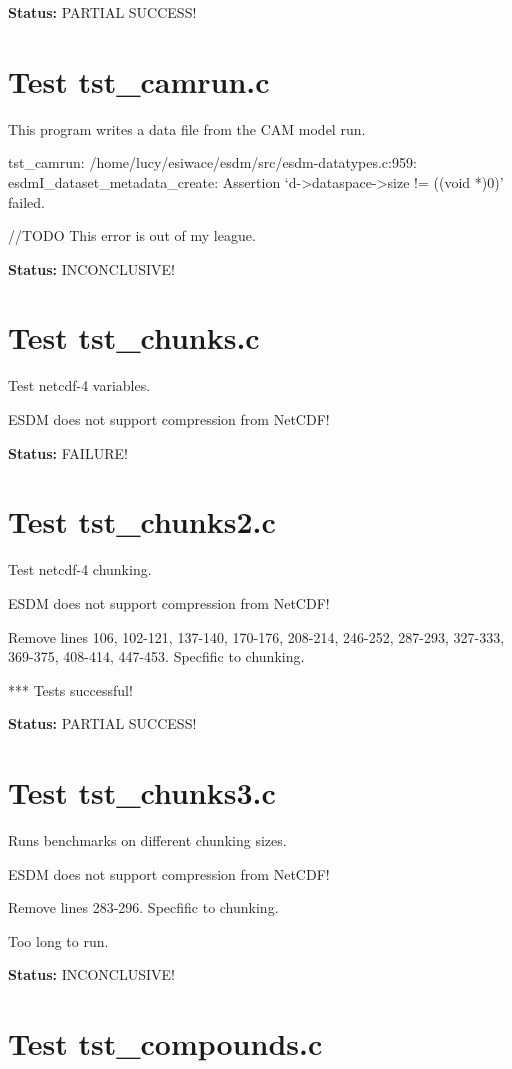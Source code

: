 {\bf \large Status: } PARTIAL SUCCESS!

\section{Test tst\_camrun.c}

This program writes a data file from the CAM model run.

tst\_camrun: /home/lucy/esiwace/esdm/src/esdm-datatypes.c:959: esdmI\_dataset\_metadata\_create: Assertion `d->dataspace->size != ((void *)0)' failed.

//TODO This error is out of my league.

{\bf \large Status: } INCONCLUSIVE!

\section{Test tst\_chunks.c}

Test netcdf-4 variables.

ESDM does not support compression from NetCDF!

{\bf \large Status: } FAILURE!

\section{Test tst\_chunks2.c}

Test netcdf-4 chunking.

ESDM does not support compression from NetCDF!

Remove lines 106, 102-121, 137-140, 170-176, 208-214, 246-252, 287-293, 327-333, 369-375, 408-414, 447-453. Specfific to chunking.

*** Tests successful!

{\bf \large Status: } PARTIAL SUCCESS!

\section{Test tst\_chunks3.c}

Runs benchmarks on different chunking sizes.

ESDM does not support compression from NetCDF!

Remove lines 283-296. Specfific to chunking.

Too long to run.

{\bf \large Status: } INCONCLUSIVE!

\section{Test tst\_compounds.c}

